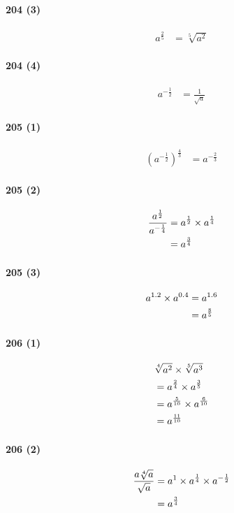 \documentclass[fleqn,a4j,dvipdfmx,uplatex,twocolumn]{jsarticle}
\def\nr{\notag\\}%
\begin{document}
\paragraph{204 (3)}
\begin{align*}
  a^{\frac{2}{5}} &= \sqrt[5]{a^2}
\end{align*}

\paragraph{204 (4)}
\begin{align*}
  a^{-\frac{1}{2}} &= \frac{1}{\sqrt{a}}
\end{align*}

\paragraph{205 (1)}
\begin{align*}
  \left(a^{-\frac{1}{2}}\right)^{\frac{4}{3}} &= a^{-\frac{2}{3}}
\end{align*}

\paragraph{205 (2)}
\begin{align*}
  \frac{a^{\frac{1}{2}}}{a^{-\frac{1}{4}}} &= a^{\frac{1}{2}} \times a^{\frac{1}{4}} \nr
  &= a^{\frac{3}{4}}
\end{align*}

\paragraph{205 (3)}
\begin{align*}
  a^{1.2} \times a^{0.4} &= a^{1.6} \nr
  &= a^{\frac{8}{5}}
\end{align*}

\paragraph{206 (1)}
\begin{align*}
  &\sqrt[4]{a^2} \times \sqrt[5]{a^3} \nr
  &= a^{\frac{2}{4}} \times a^{\frac{3}{5}} \nr
  &= a^{\frac{5}{10}} \times a^{\frac{6}{10}} \nr
  &= a^{\frac{11}{10}}
\end{align*}

\paragraph{206 (2)}
\begin{align*}
  \frac{a\sqrt[4]{a}}{\sqrt{a}} &= a^1 \times a^{\frac{1}{4}} \times a^{-\frac{1}{2}} \nr
  &= a^{\frac{3}{4}}
\end{align*}
\end{document}
